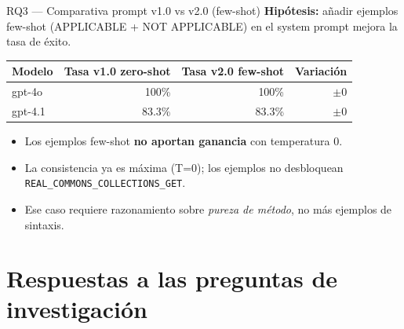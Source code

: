 \documentclass[aspectratio=169, 10pt]{beamer}
\newcommand{\warn}[1]{\textcolor{warnred}{\textbf{#1}}}
\begin{document}
\begin{frame}{RQ3 --- Comparativa prompt v1.0 vs v2.0 (few-shot)}
  \textbf{Hipótesis:} añadir ejemplos few-shot (APPLICABLE + NOT APPLICABLE)
  en el system prompt mejora la tasa de éxito.

  \vspace{0.5em}
  \begin{table}
    \centering
    \footnotesize
    \begin{tabular}{lrrr}
      \toprule
      \textbf{Modelo} & \textbf{Tasa v1.0 zero-shot} &
        \textbf{Tasa v2.0 few-shot} & \textbf{Variación} \\
      \midrule
      gpt-4o  & 100\%  & 100\%  & $\pm 0$ \\
      gpt-4.1 & 83.3\% & 83.3\% & $\pm 0$ \\
      \bottomrule
    \end{tabular}
  \end{table}

  \vspace{0.4em}
  \begin{itemize}
    \item Los ejemplos few-shot \warn{no aportan ganancia} con temperatura 0.
    \item La consistencia ya es máxima (T=0); los ejemplos no desbloquean
          \texttt{REAL\_COMMONS\_COLLECTIONS\_GET}.
    \item Ese caso requiere razonamiento sobre \emph{pureza de método},
          no más ejemplos de sintaxis.
  \end{itemize}
\end{frame}

\section{Respuestas a las preguntas de investigación}
\end{document}
